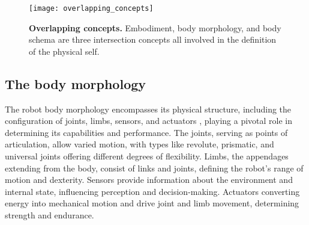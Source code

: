 %
%


\begin{figure}
	\begin{center}
		\texttt{[image: overlapping\_concepts]}
		\caption{\textbf{Overlapping concepts.} Embodiment, body morphology, and body schema are three intersection concepts all involved in the definition of the physical self.}
		\label{fig:overlapping_concepts}
	\end{center}
\end{figure}



\subsection{The body morphology}
The robot body morphology encompasses its physical structure, including the configuration of joints, limbs, sensors, and actuators \cite{Pfeifer2007SelfOrganizationEmbodiment}, playing a pivotal role in determining its capabilities and performance. The joints, serving as points of articulation, allow varied motion, with types like revolute, prismatic, and universal joints offering different degrees of flexibility. Limbs, the appendages extending from the body, consist of links and joints, defining the robot's range of motion and dexterity. Sensors provide information about the environment and internal state, influencing perception and decision-making. Actuators converting energy into mechanical motion and drive joint and limb movement, determining strength and endurance.

